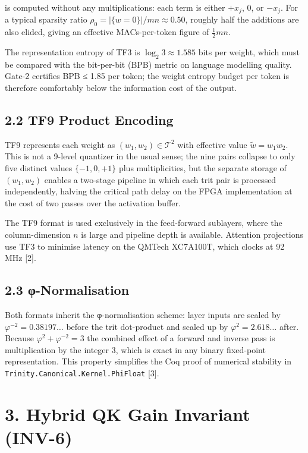 is computed without any multiplications: each term
is either \(+x_j\), \(0\), or \(-x_j\). For a
typical sparsity ratio
\(\rho_0 = |\{w=0\}|/mn \approx 0.50\), roughly
half the additions are also elided, giving an
effective MACs-per-token figure of
\(\tfrac{1}{2} mn\).

The representation entropy of TF3 is
\(\log_2 3 \approx 1.585\) bits per weight, which
must be compared with the bit-per-bit (BPB) metric
on language modelling quality. Gate-2 certifies
BPB ≤ 1.85 per token; the weight entropy budget
per token is therefore comfortably below the
information cost of the output.

\subsection{2.2 TF9 Product
Encoding}\label{fa_08:tf9-product-encoding}

TF9 represents each weight as
\((w_1, w_2) \in \mathcal{T}^2\) with effective
value \(\tilde{w} = w_1 w_2\). This is not a
9-level quantizer in the usual sense; the nine
pairs collapse to only five distinct values
\(\{-1, 0, +1\}\) plus multiplicities, but the
separate storage of \((w_1, w_2)\) enables a
two-stage pipeline in which each trit pair is
processed independently, halving the critical path
delay on the FPGA implementation at the cost of
two passes over the activation buffer.

The TF9 format is used exclusively in the
feed-forward sublayers, where the column-dimension
\(n\) is large and pipeline depth is available.
Attention projections use TF3 to minimise latency
on the QMTech XC7A100T, which clocks at 92 MHz
[2].

\subsection{2.3
φ-Normalisation}\label{fa_08:ux3c6-normalisation}

Both formats inherit the φ-normalisation scheme:
layer inputs are scaled by
\(\varphi^{-2} = 0.38197\ldots\) before the trit
dot-product and scaled up by
\(\varphi^2 = 2.618\ldots\) after. Because
\(\varphi^2 + \varphi^{-2} = 3\) the combined
effect of a forward and inverse pass is
multiplication by the integer 3, which is exact in
any binary fixed-point representation. This
property simplifies the Coq proof of numerical
stability in
\texttt{Trinity.Canonical.Kernel.PhiFloat}
[3].

\section{3. Hybrid QK Gain Invariant
(INV-6)}\label{fa_08:hybrid-qk-gain-invariant-inv-6}

